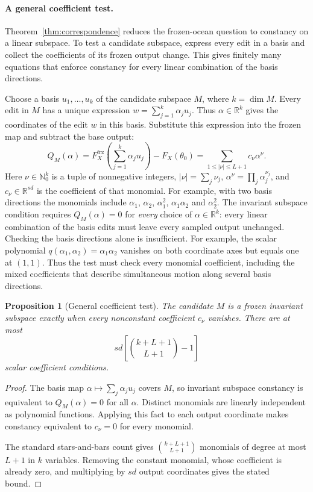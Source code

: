 \documentclass[twoside]{article}
\newtheorem{proposition}[theorem]{Proposition}
\theoremstyle{remark}
\newcommand{\R}{\mathbb R}
\newcommand{\frz}{\mathrm{frz}}
\theoremstyle{highlightdefinition}
\theoremstyle{remark}
\begin{document}
\paragraph{A general coefficient test.}
Theorem~\ref{thm:correspondence} reduces the frozen-ocean question to constancy on a linear subspace. To test a candidate subspace, express every edit in a basis and collect the coefficients of its frozen output change. This gives finitely many equations that enforce constancy for every linear combination of the basis directions.

Choose a basis $u_1,\ldots,u_k$ of the candidate subspace $M$, where $k=\dim M$. Every edit in $M$ has a unique expression $w=\sum_{j=1}^k\alpha_j u_j$. Thus $\alpha\in\R^k$ gives the coordinates of the edit $w$ in this basis. Substitute this expression into the frozen map and subtract the base output:
\[
 Q_M(\alpha)=F_X^{\frz}\left(\sum_{j=1}^k\alpha_j u_j\right)-F_X(\theta_0)
 =\sum_{1\le |\nu|\le L+1}c_\nu\alpha^\nu.
\]
Here $\nu\in\mathbb N_0^k$ is a tuple of nonnegative integers, $|\nu|=\sum_j\nu_j$, $\alpha^\nu=\prod_j\alpha_j^{\nu_j}$, and $c_\nu\in\R^{sd}$ is the coefficient of that monomial. For example, with two basis directions the monomials include $\alpha_1$, $\alpha_2$, $\alpha_1^2$, $\alpha_1\alpha_2$ and $\alpha_2^2$. The invariant subspace condition requires $Q_M(\alpha)=0$ for \emph{every} choice of $\alpha\in\R^k$: every linear combination of the basis edits must leave every sampled output unchanged. Checking the basis directions alone is insufficient. For example, the scalar polynomial $q(\alpha_1,\alpha_2)=\alpha_1\alpha_2$ vanishes on both coordinate axes but equals one at $(1,1)$. Thus the test must check every monomial coefficient, including the mixed coefficients that describe simultaneous motion along several basis directions.
\begin{proposition}[General coefficient test]\label{prop:coefficients}
The candidate $M$ is a frozen invariant subspace exactly when every nonconstant coefficient $c_\nu$ vanishes. There are at most
\[
 sd\left[\binom{k+L+1}{L+1}-1\right]
\]
scalar coefficient conditions.
\end{proposition}
\begin{proof}
The basis map $\alpha\mapsto\sum_j\alpha_j u_j$ covers $M$, so invariant subspace constancy is equivalent to $Q_M(\alpha)=0$ for all $\alpha$. Distinct monomials are linearly independent as polynomial functions. Applying this fact to each output coordinate makes constancy equivalent to $c_\nu=0$ for every monomial.

The standard stars-and-bars count gives $\binom{k+L+1}{L+1}$ monomials of degree at most $L+1$ in $k$ variables. Removing the constant monomial, whose coefficient is already zero, and multiplying by $sd$ output coordinates gives the stated bound.
\end{proof}
\end{document}
